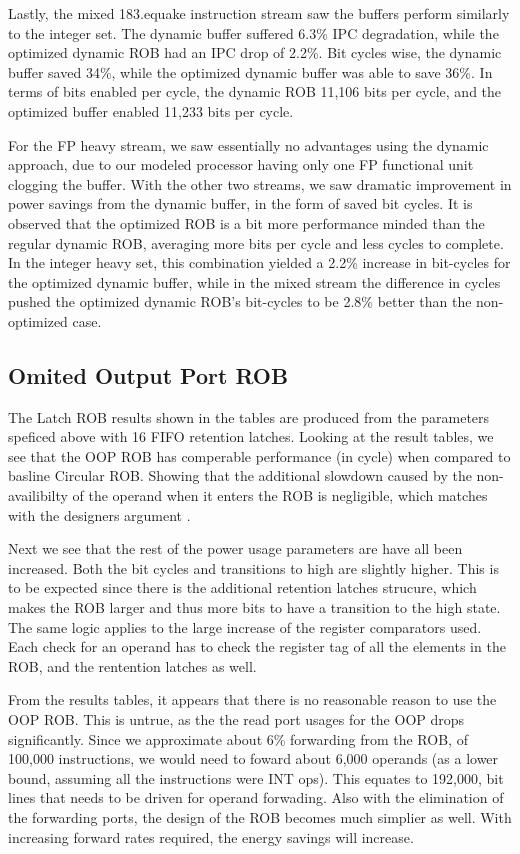 Lastly, the mixed 183.equake instruction stream saw the buffers perform similarly to the integer set. The dynamic buffer suffered 6.3\% IPC degradation, while the optimized dynamic ROB had an IPC drop of 2.2\%. Bit cycles wise, the dynamic buffer saved 34\%, while the optimized dynamic buffer was able to save 36\%. In terms of bits enabled per cycle, the dynamic ROB 11,106 bits per cycle, and the optimized buffer enabled 11,233 bits per cycle.

For the FP heavy stream, we saw essentially no advantages using the dynamic approach, due to our modeled processor having only one FP functional unit clogging the buffer. With the other two streams, we saw dramatic improvement in power savings from the dynamic buffer, in the form of saved bit cycles. It is observed that the optimized ROB is a bit more performance minded than the regular dynamic ROB, averaging more bits per cycle and less cycles to complete. In the integer heavy set, this combination yielded a 2.2\% increase in bit-cycles for the optimized dynamic buffer, while in the mixed stream the difference in cycles pushed the optimized dynamic ROB's bit-cycles to be 2.8\% better than the non-optimized case.

\subsection{Omited Output Port ROB}
The Latch ROB results shown in the tables are produced from the parameters 
speficed above with 16 FIFO retention latches. Looking at the result tables,
 we see that the OOP ROB has comperable performance (in cycle) when compared 
to basline Circular ROB.  Showing that the additional slowdown caused by the
 non-availibilty of the operand when it enters the ROB is negligible, which
matches with the designers argument \cite{kucuk}.  

Next we see that the rest of the power usage parameters are have all been 
increased.  Both the bit cycles and transitions to high are slightly higher.
This is to be expected since there is the additional retention latches 
strucure, which makes the ROB larger and thus more bits to have a transition
to the high state.  The same logic applies to the large increase of the
register comparators used.  Each check for an operand has to check the
register tag of all the elements in the ROB, and the rentention latches 
as well.  

From the results tables, it appears that there is no reasonable reason to use
the OOP ROB.  This is untrue, as the the read port usages for the OOP drops
significantly.  Since we approximate about 6\% forwarding from the ROB, of 
100,000 instructions, we would need to foward about 6,000 operands (as a
lower bound, assuming all the instructions were INT ops).  This equates to
192,000, bit lines that needs to be driven for operand forwading.  Also with
the elimination of the forwarding ports, the design of the ROB becomes much 
simplier as well. With increasing forward rates required, the energy savings
will increase.

